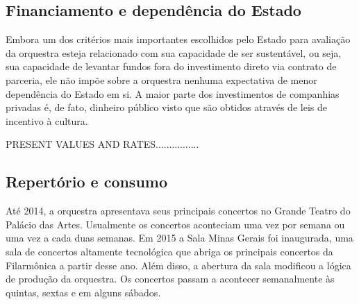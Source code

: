 \documentclass[a4paper, 12pt, openright, oneside, german, french, english, brazil]{abntex2}
\begin{document}
	
	
	\subsection{Financiamento e dependência do Estado}
	
	
	Embora um dos critérios mais importantes escolhidos pelo Estado para avaliação da orquestra esteja relacionado com sua capacidade de ser sustentável, ou seja, sua capacidade de levantar fundos fora do investimento direto via contrato de parceria, ele não impõe sobre a orquestra nenhuma expectativa de menor dependência do Estado em si. A maior parte dos investimentos de companhias privadas é, de fato, dinheiro público visto que são obtidos através de leis de incentivo à cultura.
	
	PRESENT VALUES AND RATES................
	
	
	\subsection{Repertório e consumo}
	
	
	Até 2014, a orquestra apresentava seus principais concertos no Grande Teatro do Palácio das Artes. Usualmente os concertos aconteciam uma vez por semana ou uma vez a cada duas semanas. Em 2015 a Sala Minas Gerais foi inaugurada, uma sala de concertos altamente tecnológica que abriga os principais concertos da Filarmônica a partir desse ano. Além disso, a abertura da sala modificou a lógica de produção da orquestra. Os concertos passam a acontecer semanalmente às quintas, sextas e em alguns sábados.
		
\end{document}
